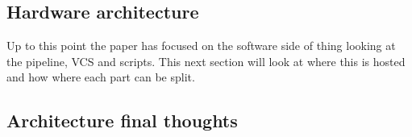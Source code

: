 \subsection{Hardware architecture}

Up to this point the paper has focused on the software side of thing looking at the pipeline, VCS and scripts. This next section will look at where this is hosted and how where each part can be split.  



\subsection{Architecture final thoughts}

